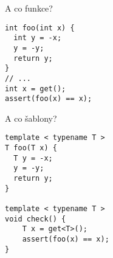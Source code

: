 \documentclass[11pt]{beamer}
\begin{document}
\begin{frame}[fragile]{A co funkce?}
\begin{lstlisting}
int foo(int x) {
  int y = -x;
  y = -y;
  return y;
}
// ...
int x = get();
assert(foo(x) == x);
\end{lstlisting}
\end{frame}


\begin{frame}[fragile]{A co šablony?}
\begin{lstlisting}
template < typename T >
T foo(T x) {
  T y = -x;
  y = -y;
  return y;
}

template < typename T >
void check() {
    T x = get<T>();
    assert(foo(x) == x);
}
\end{lstlisting}
\end{frame}
\end{document}
